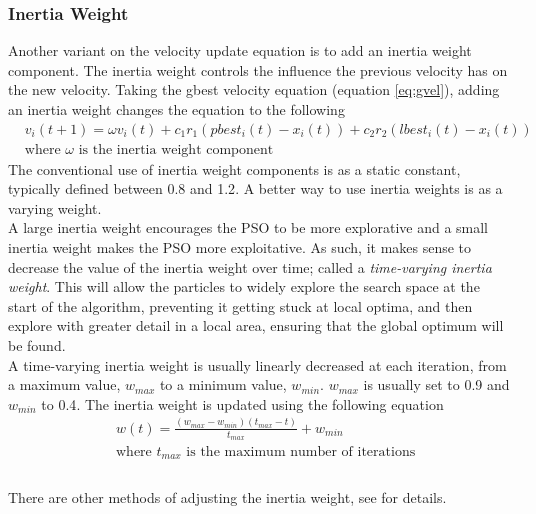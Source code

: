 \subsubsection{Inertia Weight}
Another variant on the velocity update equation is to add an inertia weight component. The inertia weight controls the influence the previous velocity has on the new velocity\cite{4-pso, mopso, psoi}. Taking the gbest velocity equation (equation \ref{eq:gvel}), adding an inertia weight changes the equation to the following
 \begin{equation}
  \begin{split}
    &v_{i}(t+1) = \omega v_{i}(t) + c_{1}r_{1}(pbest_{i}(t) - x_{i}(t)) + c_{2}r_{2}(lbest_{i}(t) - x_{i}(t)) \\
    &\text{where }\omega\text{ is the inertia weight component}
  \end{split}
\label{eq:inertia}
\end{equation}
The conventional use of inertia weight components is as a static constant, typically defined between 0.8 and 1.2\cite{psot}. A better way to use inertia weights is as a varying weight.
\\A large inertia weight encourages the PSO to be more explorative and a small inertia weight makes the PSO more exploitative. As such, it makes sense to decrease the value of the inertia weight over time; called a \emph{time-varying inertia weight}. This will allow the particles to widely explore the search space at the start of the algorithm, preventing it getting stuck at local optima, and then explore with greater detail in a local area, ensuring that the global optimum will be found.
\\A time-varying inertia weight is usually linearly decreased at each iteration, from a maximum value, $w_{max}$ to a minimum value, $w_{min}$. $w_{max}$ is usually set to 0.9 and $w_{min}$ to 0.4\cite{4-pso, psoi}. The inertia weight is updated using the following equation\cite{4-pso, psoi, vi}
\begin{equation}
  \begin{split}
    &w(t) = \frac{(w_{max} - w_{min})(t_{max} - t)}{t_{max}} + w_{min} \\
    &\text{where } t_{max}\text{ is the maximum number of iterations} \\
  \end{split}
\end{equation}
\\There are other methods of adjusting the inertia weight, see \cite{4-pso} for details.

